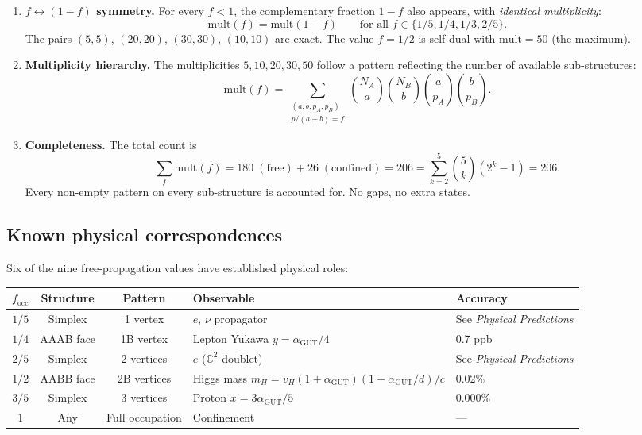 \documentclass[12pt]{article}
\theoremstyle{remark}
\theoremstyle{definition}
\newcommand{\CC}{\mathbb{C}}
\newcommand{\agut}{\alpha_{\mathrm{GUT}}}
\begin{document}
\begin{enumerate}
\item \textbf{$f \leftrightarrow (1-f)$ symmetry.}  For every $f < 1$, the complementary fraction $1 - f$ also appears, with \emph{identical multiplicity}:
\begin{equation}
\mathrm{mult}(f) = \mathrm{mult}(1 - f) \qquad \text{for all } f \in \{1/5, 1/4, 1/3, 2/5\}.
\end{equation}
The pairs $(5, 5)$, $(20, 20)$, $(30, 30)$, $(10, 10)$ are exact.  The value $f = 1/2$ is self-dual with $\mathrm{mult} = 50$ (the maximum).

\item \textbf{Multiplicity hierarchy.}  The multiplicities $5, 10, 20, 30, 50$ follow a pattern reflecting the number of available sub-structures:
\begin{equation}
\mathrm{mult}(f) = \sum_{\substack{(a,b,p_A,p_B) \\ p/(a+b) = f}} \binom{N_A}{a}\binom{N_B}{b}\binom{a}{p_A}\binom{b}{p_B}.
\end{equation}

\item \textbf{Completeness.}  The total count is
\begin{equation}
\sum_f \mathrm{mult}(f) = 180\;(\text{free}) + 26\;(\text{confined}) = 206 = \sum_{k=2}^{5} \binom{5}{k}(2^k - 1) = 206.
\end{equation}
Every non-empty pattern on every sub-structure is accounted for.  No gaps, no extra states.
\end{enumerate}

\subsection{Known physical correspondences}
\label{sec:known_correspondences}

Six of the nine free-propagation values have established physical roles:

\begin{center}
\begin{tabular}{cccll}
\hline
$f_\mathrm{occ}$ & Structure & Pattern & Observable & Accuracy \\
\hline
$1/5$ & Simplex & 1 vertex & $e$, $\nu$ propagator & See \textit{Physical Predictions} \\
$1/4$ & AAAB face & 1B vertex & Lepton Yukawa $y = \agut/4$ & 0.7 ppb \\
$2/5$ & Simplex & 2 vertices & $e$ ($\CC^2$ doublet) & See \textit{Physical Predictions} \\
$1/2$ & AABB face & 2B vertices & Higgs mass $m_H = v_H(1+\agut)(1-\agut/d)/c$ & 0.02\% \\
$3/5$ & Simplex & 3 vertices & Proton $x = 3\agut/5$ & 0.000\% \\
$1$   & Any & Full occupation & Confinement & --- \\
\hline
\end{tabular}
\end{center}
\end{document}
